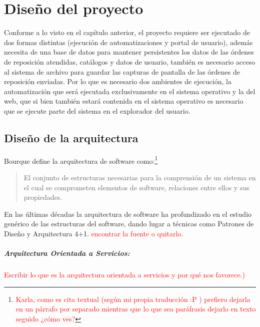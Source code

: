 \chapter{Diseño del proyecto}\label{cap3}
Conforme a lo visto en el capítulo anterior, el proyecto requiere ser ejecutado de dos formas distintas (ejecución de automatizaciones y portal de usuario), además necesita de una base de datos para mantener persistentes los datos de las órdenes de reposición atendidas, catálogos y datos de usuario, también es necesario acceso al sistema de archivo para guardar las capturas de pantalla de las órdenes de reposición enviadas. Por lo que es necesario dos ambientes de ejecución, la automatización que será ejecutada exclusivamente en el sistema operativo y la del web, que si bien también estará contenida en el sistema operativo es necesario que se ejecute parte del sistema en el explorador del usuario.




\section{Diseño de la arquitectura}
Bourque define la arquitectura de software como:\footnote{\textcolor{red}{Karla, como es cita textual (según mi propia traducción :P ) prefiero dejarla en un párrafo por separado mientras que lo que sea paráfrasis dejarlo en texto seguido ¿cómo ves?}}
\begin{quote}
	El conjunto de estructuras necesarias para la comprensión de un sistema en el cual se comprometen elementos de software, relaciones entre ellos y sus propiedades\cite{SWEBOOK}.
\end{quote}
En las últimas décadas la arquitectura de software ha profundizado en el estudio genérico de las estructuras del software, dando lugar a técnicas como Patrones de Diseño y Arquitectura 4+1. \textcolor{red}{encontrar la fuente o quitarlo.}
\paragraph{Arquitectura Orientada a Servicios:}
\textcolor{red}{Escribir lo que es la arquitectura orientada a servicios y por qué nos favorece.)}
